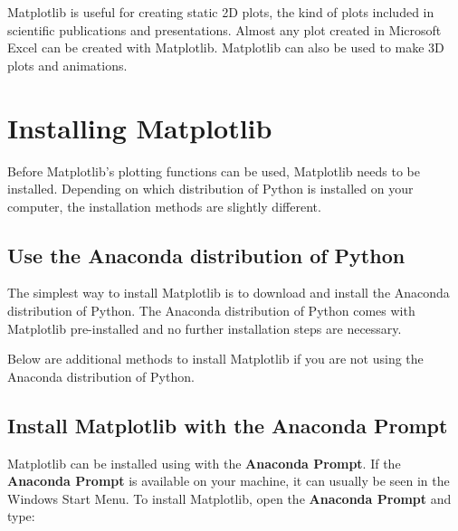 \documentclass{book}
\begin{document}
    
        Matplotlib is useful for creating static 2D plots, the kind of plots
included in scientific publications and presentations. Almost any plot
created in Microsoft Excel can be created with Matplotlib. Matplotlib
can also be used to make 3D plots and animations.
    




    
        \hypertarget{installing-matplotlib}{%
\section{Installing Matplotlib}\label{installing-matplotlib}}
    




    
        Before Matplotlib's plotting functions can be used, Matplotlib needs to
be installed. Depending on which distribution of Python is installed on
your computer, the installation methods are slightly different.
    




    
        \hypertarget{use-the-anaconda-distribution-of-python}{%
\subsection{Use the Anaconda distribution of
Python}\label{use-the-anaconda-distribution-of-python}}

The simplest way to install Matplotlib is to download and install the
Anaconda distribution of Python. The Anaconda distribution of Python
comes with Matplotlib pre-installed and no further installation steps
are necessary.

Below are additional methods to install Matplotlib if you are not using
the Anaconda distribution of Python.
    




    
        \hypertarget{install-matplotlib-with-the-anaconda-prompt}{%
\subsection{Install Matplotlib with the Anaconda
Prompt}\label{install-matplotlib-with-the-anaconda-prompt}}

Matplotlib can be installed using with the \textbf{Anaconda Prompt}. If
the \textbf{Anaconda Prompt} is available on your machine, it can
usually be seen in the Windows Start Menu. To install Matplotlib, open
the \textbf{Anaconda Prompt} and type:
\end{document}
